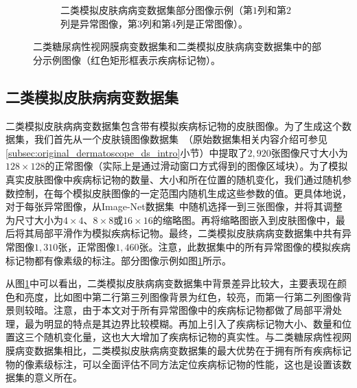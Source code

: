 \begin{figure}[h!]
\begin{subfigure}{0.48\textwidth}
		\caption{二类模拟皮肤病病变数据集部分图像示例（第$1$列和第$2$列是异常图像，第$3$列和第$4$列是正常图像）。}
		\label{subfig:bin_simulate_skin_example}
	\end{subfigure}
	\caption[本章实验数据集部分示例图像]{二类糖尿病性视网膜病变数据集和二类模拟皮肤病病变数据集中的部分示例图像（红色矩形框表示疾病标记物）。}
	\label{mul_fig:bin_ds_example}
\end{figure}
\subsection{二类模拟皮肤病病变数据集}\label{subsec:bin_simulated_skin_ds}
二类模拟皮肤病病变数据集包含带有模拟疾病标记物的皮肤图像。为了生成这个数据集，我们首先从一个皮肤镜图像数据集~\cite{codella2018skin}（原始数据集相关内容介绍可参见\ref{subsec:original_dermatoscope_ds_intro}小节）中提取了$2,920$张图像尺寸大小为$128\times128$的正常图像（实际上是通过滑动窗口方式得到的图像区域块）。为了模拟真实皮肤图像中疾病标记物的数量、大小和所在位置的随机变化，我们通过随机参数控制，在每个模拟皮肤图像的一定范围内随机生成这些参数的值。更具体地说，对于每张异常图像，从Image-Net数据集~\cite{deng2009imagenet}中随机选择一到三张图像，并将其调整为尺寸大小为$4\times 4$、$8\times 8$或$16\times 16$的缩略图。再将缩略图嵌入到皮肤图像中，最后将其局部平滑作为模拟疾病标记物。最终，二类模拟皮肤病病变数据集中共有异常图像$1,310$张，正常图像$1,460$张。注意，此数据集中的所有异常图像的模拟疾病标记物都有像素级的标注。部分图像示例如图\ref{subfig:bin_simulate_skin_example}所示。

从图\ref{subfig:bin_simulate_skin_example}中可以看出，二类模拟皮肤病病变数据集中背景差异比较大，主要表现在颜色和亮度，比如图中第二行第三列图像背景为红色，较亮，而第一行第二列图像背景则较暗。注意，由于本文对于所有异常图像中的疾病标记物都做了局部平滑处理，最为明显的特点是其边界比较模糊。再加上引入了疾病标记物大小、数量和位置这三个随机变化量，这也大大增加了疾病标记物的真实性。与二类糖尿病性视网膜病变数据集相比，二类模拟皮肤病病变数据集的最大优势在于拥有所有疾病标记物的像素级标注，可以全面评估不同方法定位疾病标记物的性能，这也是设置该数据集的意义所在。
